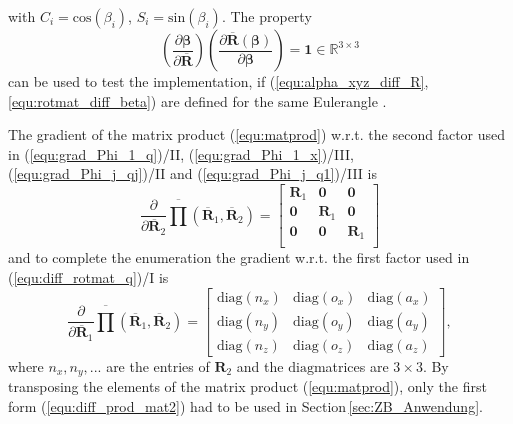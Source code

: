 \documentclass[robotics,article,accept,moreauthors,pdftex]{Definitions/mdpi}
\newcommand{\bm}[1]{\boldsymbol{#1}}
\begin{document}
%
with $C_i=\mathrm{cos}(\beta_i)$, $S_i=\mathrm{sin}(\beta_i)$.
The property
%
\begin{equation}
\left(\frac{\partial \bm{\beta}}{\partial \overline{\bm{R}}}\right)
\left(\frac{\partial \overline{\bm{R}}(\bm{\beta})}{\partial \bm{\beta}}\right)
=
\bm{1} \in {\mathbb{R}}^{3 \times 3}
\end{equation}
%
can be used to test the implementation, if (\ref{equ:alpha_xyz_diff_R}, \ref{equ:rotmat_diff_beta}) are defined for the same Euler\replaced[id=Sp]{ }{-}angle\replaced[id=Sp]{ }{-} .

The gradient of the matrix product (\ref{equ:matprod}) w.r.t. the second factor used in (\ref{equ:grad_Phi_1_q})/II, (\ref{equ:grad_Phi_1_x})/III, (\ref{equ:grad_Phi_j_qj})/II and (\ref{equ:grad_Phi_j_q1})/III is
%
\begin{equation}
\frac{\partial }{\partial \overline{\bm{R}}_2}
\overline{\prod}\left( \overline{\bm{R}}_1, \overline{\bm{R}}_2\right)
=
\begin{bmatrix}
\bm{R}_1 & \bm{0} & \bm{0} \\
\bm{0} & \bm{R}_1 & \bm{0} \\
\bm{0} & \bm{0} & \bm{R}_1 \\
\end{bmatrix}
\label{equ:diff_prod_mat2}
\end{equation}
%
and to complete the enumeration the gradient w.r.t. the first factor used in (\ref{equ:diff_rotmat_q})/I is
%
\begin{equation}
\frac{\partial }{\partial \overline{\bm{R}}_1}
\overline{\prod}\left( \overline{\bm{R}}_1, \overline{\bm{R}}_2\right)
=
\begin{bmatrix}
{\mathrm{diag}}(n_x)&{\mathrm{diag}}(o_x)&{\mathrm{diag}}(a_x) \\ {\mathrm{diag}}(n_y)&{\mathrm{diag}}(o_y)&{\mathrm{diag}}(a_y)\\ {\mathrm{diag}}(n_z)&{\mathrm{diag}}(o_z)&{\mathrm{diag}}(a_z)
\end{bmatrix},
\label{equ:diff_prod_mat1}
\end{equation}
%
where $n_x,n_y,...$ are the entries of $\bm{R}_2$ and the $\mathrm{diag}$\replaced[id=Sp]{ }{-}matrices are $3 \times 3$.
By transposing the elements of the matrix product (\ref{equ:matprod}), only the first form (\ref{equ:diff_prod_mat2}) had to be used in  Section\,\ref{sec:ZB_Anwendung}.
\end{document}
